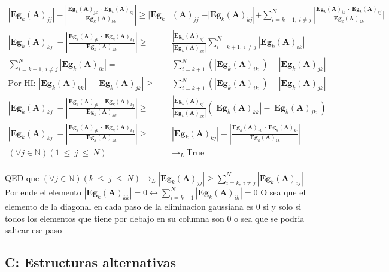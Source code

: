 \begin{align*}
    |\textbf{Eg}_{k}(\textbf{A})_{jj}| - |\frac {\textbf{Eg}_{k}(\textbf{A})_{jk} \ \cdot \ \textbf{Eg}_{k}(\textbf{A})_{kj}}{\textbf{Eg}_{k}(\textbf{A})_{kk}}| \geq |\textbf{Eg}_{k}&(\textbf{A})_{jj}| - |\textbf{Eg}_{k}(\textbf{A})_{kj}| +  \sum_{i=k+1, \ i \neq j}^{N} |\frac{\textbf{Eg}_{k}(\textbf{A})_{ik} \ \cdot \ \textbf{Eg}_{k}(\textbf{A})_{kj}}{\textbf{Eg}_{k}(\textbf{A})_{kk}}| \\
    |\textbf{Eg}_{k}(\textbf{A})_{kj}| - |\frac {\textbf{Eg}_{k}(\textbf{A})_{jk} \ \cdot \ \textbf{Eg}_{k}(\textbf{A})_{kj}}{\textbf{Eg}_{k}(\textbf{A})_{kk}}| \geq  &\frac{ |\textbf{Eg}_{k}(\textbf{A})_{kj}|}{|\textbf{Eg}_{k}(\textbf{A})_{kk}|} \sum_{i=k+1, \ i \neq j}^{N} |\textbf{Eg}_{k}(\textbf{A})_{ik}|\\
    \sum_{i=k+1, \ i \neq j}^{N} |\textbf{Eg}_{k}(\textbf{A})_{ik}| = &\sum_{i=k+1}^{N} (|\textbf{Eg}_{k}(\textbf{A})_{ik}|) -  |\textbf{Eg}_{k}(\textbf{A})_{jk}|\\
    \text{Por HI: } |\textbf{Eg}_{k}(\textbf{A})_{kk}| -  |\textbf{Eg}_{k}(\textbf{A})_{jk}| \geq &\sum_{i=k+1}^{N} (|\textbf{Eg}_{k}(\textbf{A})_{ik}|) -  |\textbf{Eg}_{k}(\textbf{A})_{jk}|\\
    |\textbf{Eg}_{k}(\textbf{A})_{kj}| - |\frac {\textbf{Eg}_{k}(\textbf{A})_{jk} \ \cdot \ \textbf{Eg}_{k}(\textbf{A})_{kj}}{\textbf{Eg}_{k}(\textbf{A})_{kk}}| \geq  &\frac{ |\textbf{Eg}_{k}(\textbf{A})_{kj}|}{|\textbf{Eg}_{k}(\textbf{A})_{kk}|} (|\textbf{Eg}_{k}(\textbf{A})_{kk}| -  |\textbf{Eg}_{k}(\textbf{A})_{jk}|)\\
    |\textbf{Eg}_{k}(\textbf{A})_{kj}| - |\frac {\textbf{Eg}_{k}(\textbf{A})_{jk} \ \cdot \ \textbf{Eg}_{k}(\textbf{A})_{kj}}{\textbf{Eg}_{k}(\textbf{A})_{kk}}| \geq  &|\textbf{Eg}_{k}(\textbf{A})_{kj}| - |\frac {\textbf{Eg}_{k}(\textbf{A})_{jk} \ \cdot \ \textbf{Eg}_{k}(\textbf{A})_{kj}}{\textbf{Eg}_{k}(\textbf{A})_{kk}}|\\
    (\forall j \in 	\mathbb{N}) (1 \ \leq \ j \ \leq \ N ) &\longrightarrow_L \ \text{True} \\ 
\end{align*}

QED que $(\forall j \in \mathbb{N}) (k \ \leq \ j \ \leq \ N ) \longrightarrow_L |\textbf{Eg}_{k}(\textbf{A})_{jj}| \geq \sum_{i=k, \ i \neq j}^{N} |\textbf{Eg}_{k}(\textbf{A})_{ij}|$\\
Por ende el elemento $|\textbf{Eg}_{k}(\textbf{A})_{kk}| = 0 \leftrightarrow \sum_{i=k+1}^{N} |\textbf{Eg}_{k}(\textbf{A})_{ik}| = 0$
O sea que el elemento de la diagonal en cada paso de la eliminacion gaussiana es 0 si y solo si todos los elementos que tiene por debajo en su columna son 0 o sea que se podria saltear ese paso


 


\subsection{C: Estructuras alternativas}\label{A.3}